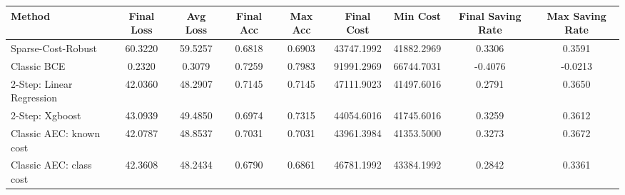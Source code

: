 \begin{tabular}{lcccccccc}
\toprule
Method & Final Loss & Avg Loss & Final Acc & Max Acc & Final Cost & Min Cost & Final Saving Rate & Max Saving Rate \\
\midrule
Sparse-Cost-Robust & 60.3220 & 59.5257 & 0.6818 & 0.6903 & 43747.1992 & 41882.2969 & 0.3306 & 0.3591 \\
Classic BCE & 0.2320 & 0.3079 & 0.7259 & 0.7983 & 91991.2969 & 66744.7031 & -0.4076 & -0.0213 \\
2-Step: Linear Regression & 42.0360 & 48.2907 & 0.7145 & 0.7145 & 47111.9023 & 41497.6016 & 0.2791 & 0.3650 \\
2-Step: Xgboost & 43.0939 & 49.4850 & 0.6974 & 0.7315 & 44054.6016 & 41745.6016 & 0.3259 & 0.3612 \\
Classic AEC: known cost & 42.0787 & 48.8537 & 0.7031 & 0.7031 & 43961.3984 & 41353.5000 & 0.3273 & 0.3672 \\
Classic AEC: class cost & 42.3608 & 48.2434 & 0.6790 & 0.6861 & 46781.1992 & 43384.1992 & 0.2842 & 0.3361 \\
\bottomrule
\end{tabular}
